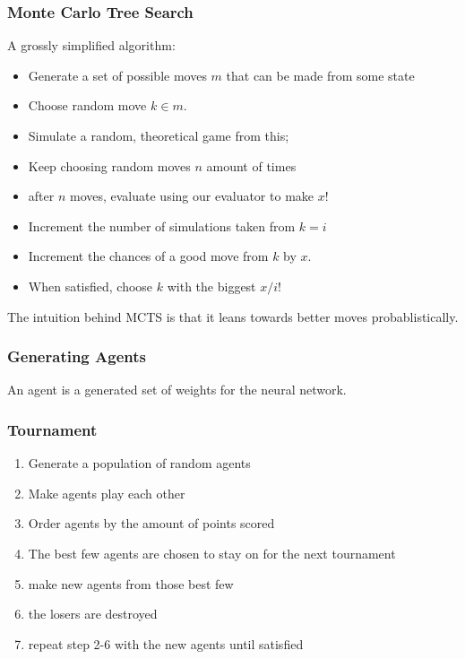 \documentclass[aspectratio=169]{beamer}
\begin{document}
	\begin{frame}
		\frametitle{Monte Carlo Tree Search}

		A grossly simplified algorithm:

		\begin{itemize}
			\item Generate a set of possible moves $m$ that can be made from some state
			\item Choose random move $k \in m$.
			\item Simulate a random, theoretical game from this;
			\item Keep choosing random moves $n$ amount of times
			\item after $n$ moves, evaluate using our evaluator to make $x$!
			\item Increment the number of simulations taken from $k = i$ 
			\item Increment the chances of a good move from $k$ by $x$.
			\item When satisfied, choose $k$ with the biggest $x/i$!
		\end{itemize}

		The intuition behind MCTS is that it leans towards better moves probablistically.
	\end{frame}

	\begin{frame}
		\frametitle{Generating Agents}
		An agent is a generated set of weights for the neural network.
	\end{frame}

	\begin{frame}
		\frametitle{Tournament}
		\begin{enumerate}
			\item Generate a population of random agents
			\item Make agents play each other
			\item Order agents by the amount of points scored
			\item The best few agents are chosen to stay on for the next tournament
			\item make new agents from those best few
			\item the losers are destroyed
			\item repeat step 2-6 with the new agents until satisfied
		\end{enumerate}
	\end{frame}
\end{document}
